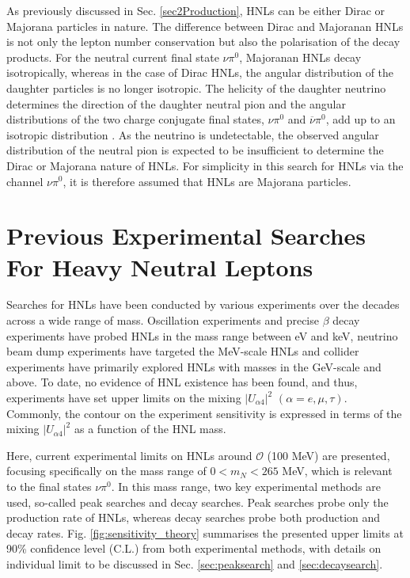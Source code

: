 As previously discussed in Sec. \ref{sec2Production}, HNLs can be either Dirac or Majorana particles in nature.
The difference between Dirac and Majoranan HNLs is not only the lepton number conservation but also the polarisation of the decay products.
For the neutral current final state $\nu\pi^0$, Majoranan HNLs decay isotropically, whereas in the case of Dirac HNLs, the angular distribution of the daughter particles is no longer isotropic.
The helicity of the daughter neutrino determines the direction of the daughter neutral pion and the angular distributions of the two charge conjugate final states, $\nu\pi^{0}$ and $\overline{\nu}\pi^{0}$, add up to an isotropic distribution  \cite{HNLSilvia}.
As the neutrino is undetectable, the observed angular distribution of the neutral pion is expected to be insufficient to determine the Dirac or Majorana nature of HNLs.
For simplicity in this search for HNLs via the channel $\nu\pi^0$, it is therefore assumed that HNLs are Majorana particles.

\section{Previous Experimental Searches For Heavy Neutral Leptons}
\label{sec2Previous}


Searches for HNLs have been conducted by various experiments over the decades across a wide range of mass.
Oscillation experiments and precise $\beta$ decay experiments have probed HNLs in the mass range between eV and keV, neutrino beam dump experiments have targeted the MeV-scale HNLs and collider experiments have primarily explored HNLs with masses in the GeV-scale and above.
To date, no evidence of HNL existence has been found, and thus, experiments have set upper limits on the mixing $|U_{\alpha4}|^{2}$ $(\alpha=e,\mu,\tau)$.
Commonly, the contour on the experiment sensitivity is expressed in terms of the mixing $|U_{\alpha4}|^{2}$ as a function of the HNL mass.

Here, current experimental limits on HNLs around $\mathcal{O}$ (100 MeV) are presented, focusing specifically on the mass range of $ 0 < m_{N} < 265 $ MeV, which is relevant to the final states $\nu\pi^{0}$.
In this mass range, two key experimental methods are used, so-called peak searches and decay searches.
Peak searches probe only the production rate of HNLs, whereas decay searches probe both production and decay rates.
Fig. \ref{fig:sensitivity_theory} summarises the presented upper limits at 90\% confidence level (C.L.) from both experimental methods, with details on individual limit to be discussed in Sec. \ref{sec:peaksearch} and \ref{sec:decaysearch}.

